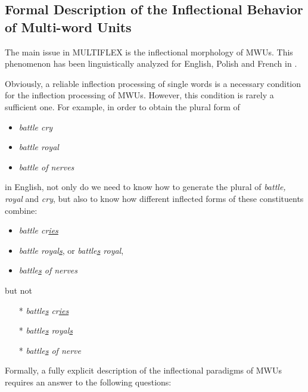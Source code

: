 \subsection{Formal Description of the Inflectional Behavior of Multi-word Units}
\label{subsec:MWUs inflection}
The main issue in MULTIFLEX is the inflectional morphology of MWUs. This phenomenon has 
been linguistically analyzed for English, Polish and French in \cite{these-Savary}. 

\bigskip
\noindent Obviously, a reliable inflection processing of single words is a
necessary condition for the inflection processing of MWUs. However, this condition 
is rarely a sufficient one. For example, in order to obtain the plural form of 

\begin{itemize}
\item \emph{battle cry}
\item \emph{battle royal}
\item \emph{battle of nerves}
\end{itemize}

\noindent in English, not only do we need to know how to generate the plural 
of \emph{battle, royal} and \emph{cry}, but also to know how different
inflected forms of these constituents combine:

\begin{itemize}
\item \emph{battle cr\underline{ies}}
\item \emph{battle royal\underline{s}}, or \emph{battle\underline{s} royal},
\item \emph{battle\underline{s} of nerves}
\end{itemize}

\noindent but not
 
\begin{itemize}
\item[*] {\emph{battle\underline{s} cr\underline{ies}}}
\item[*] {\emph{battle\underline{s} royal\underline{s}}}
\item[*] {\emph{battle\underline{s} of nerve\underline{ }}}
\end{itemize}

\bigskip
\noindent Formally, a fully explicit description of the inflectional paradigms of 
MWUs requires an answer to the following questions:


